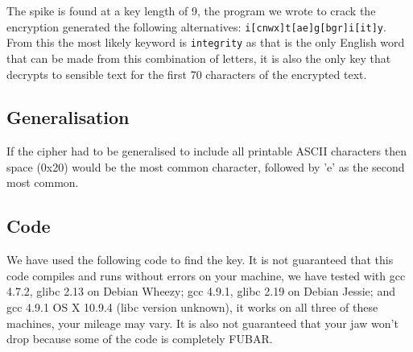 The spike is found at a key length of 9, the program we wrote to crack the encryption generated the following alternatives: \texttt{i[cnwx]t[ae]g[bgr]i[it]y}. From this the most likely keyword is \texttt{integrity} as that is the only English word that can be made from this combination of letters, it is also the only key that decrypts to sensible text for the first 70 characters of the encrypted text.

\subsection{Generalisation}
If the cipher had to be generalised to include all printable ASCII characters then space (0x20) would be the most common character, followed by 'e' as the second most common.

\subsection{Code}
We have used the following code to find the key. It is not guaranteed that this code compiles and runs without errors on your machine, we have tested with gcc 4.7.2, glibc 2.13 on Debian Wheezy; gcc 4.9.1, glibc 2.19 on Debian Jessie; and gcc 4.9.1 OS X 10.9.4 (libc version unknown), it works on all three of these machines, your mileage may vary. It is also not guaranteed that your jaw won't drop because some of the code is completely FUBAR.


